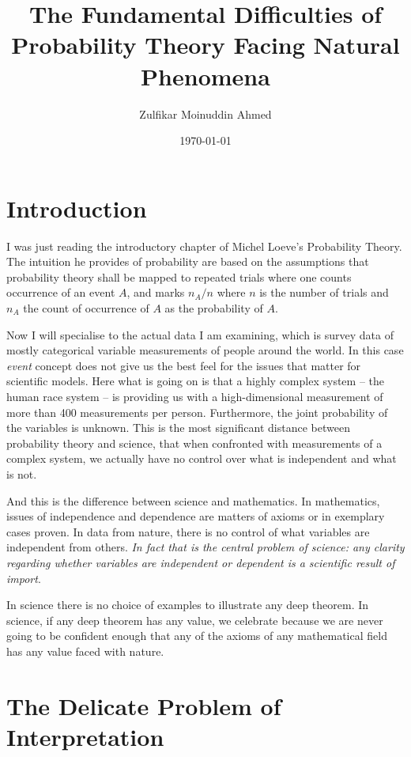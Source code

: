 \documentclass{amsart}
\title{The Fundamental Difficulties of Probability Theory Facing Natural Phenomena}
\author{Zulfikar Moinuddin Ahmed}
\date{\today}
\begin{document}
\maketitle

\section{Introduction}

I was just reading the introductory chapter of Michel Loeve's Probability Theory.  The intuition he provides of probability are based on the assumptions that probability theory shall be mapped to repeated trials where one counts occurrence of an event $A$, and marks $n_A/n$ where $n$ is the number of trials and $n_A$ the count of occurrence of $A$ as the probability of $A$.

Now I will specialise to the actual data I am examining, which is survey data of mostly categorical variable measurements of people around the world.  In this case {\em event} concept does not give us the best feel for the issues that matter for scientific models.  Here what is going on is that a highly complex system -- the human race system -- is providing us with a high-dimensional measurement of more than 400 measurements per person. Furthermore, the joint probability of the variables is unknown.  This is the most significant distance between probability theory and science, that when confronted with measurements of a complex system, we actually have no control over what is independent and what is not.

And this is the difference between science and mathematics.  In mathematics, issues of independence and dependence are matters of axioms or in exemplary cases proven.  In data from nature, there is no control of what variables are independent from others.  {\em In fact that is the central problem of science: any clarity regarding whether variables are independent or dependent is a scientific result of import}. 

In science there is no choice of examples to illustrate any deep theorem.  In science, if any deep theorem has any value, we celebrate because we are never going to be confident enough that any of the axioms of any mathematical field has any value faced with nature.

\section{The Delicate Problem of Interpretation}
\end{document}

